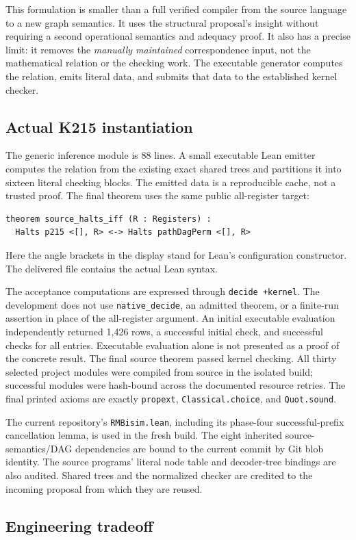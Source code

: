 \documentclass[11pt]{article}
\theoremstyle{definition}\newtheorem{definition}[theorem]{Definition}
\newcommand{\AutoStatus}{The final source theorem passed kernel checking. All thirty selected project modules were compiled from source in the isolated build; successful modules were hash-bound across the documented resource retries. The final printed axioms are exactly \texttt{propext}, \texttt{Classical.choice}, and \texttt{Quot.sound}.}
\begin{document}
This formulation is smaller than a full verified compiler from the source
language to a new graph semantics. It uses the structural proposal's insight
without requiring a second operational semantics and adequacy proof. It also
has a precise limit: it removes the \emph{manually maintained} correspondence
input, not the mathematical relation or the checking work. The executable
generator computes the relation, emits literal data, and submits that data to
the established kernel checker.

\subsection{Actual K215 instantiation}

The generic inference module is 88 lines. A small executable Lean emitter
computes the relation from the existing exact shared trees and partitions it
into sixteen literal checking blocks. The emitted data is a reproducible cache,
not a trusted proof. The final theorem uses the same public all-register target:
\begin{lstlisting}
theorem source_halts_iff (R : Registers) :
  Halts p215 <[], R> <-> Halts pathDagPerm <[], R>
\end{lstlisting}
Here the angle brackets in the display stand for Lean's configuration
constructor. The delivered file contains the actual Lean syntax.

The acceptance computations are expressed through \texttt{decide +kernel}.
The development does not use \texttt{native\_decide}, an admitted theorem,
or a finite-run assertion in place of the all-register argument. An initial
executable evaluation independently returned 1,426 rows, a successful initial
check, and successful checks for all entries. Executable evaluation alone is
not presented as a proof of the concrete result. \AutoStatus

\AutoMeasurements

The current repository's \texttt{RMBisim.lean}, including its phase-four
successful-prefix cancellation lemma, is used in the fresh build. The eight
inherited source-semantics/DAG dependencies are bound to the current commit by
Git blob identity. The source programs' literal node table and decoder-tree
bindings are also audited. Shared trees and the normalized checker are credited
to the incoming proposal from which they are reused.

\subsection{Engineering tradeoff}
\end{document}
